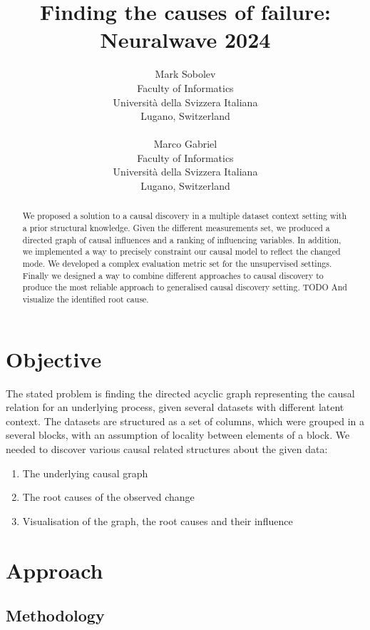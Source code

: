 \documentclass{article}
\title{Finding the causes of failure: Neuralwave 2024}
\author{
	Mark Sobolev\\
	Faculty of Informatics\\
	Università della Svizzera Italiana\\
	Lugano, Switzerland \\
	\\
	\And
	Marco Gabriel \\
	Faculty of Informatics \\
	Università della Svizzera Italiana\\
	Lugano, Switzerland \\
}
\begin{document}
	
	
	\maketitle
	

	\begin{abstract}
		We proposed a solution to a causal discovery in a multiple dataset context setting with a prior structural knowledge. Given the different measurements set, we produced a directed graph of causal influences and a ranking of influencing variables. In addition, we implemented a way to precisely constraint our causal model to reflect the changed mode. We developed a complex evaluation metric set for the unsupervised settings. Finally we designed a way to combine different approaches to causal discovery to produce the most reliable approach to generalised causal discovery setting. TODO
        And visualize the identified root cause.
	\end{abstract}
	
	
	\section{Objective} %
	
	The stated problem is finding the directed acyclic graph representing the causal relation for an underlying process, given several datasets with different latent context. The datasets are structured as a set of columns, which were grouped in a several blocks, with an assumption of locality between elements of a block. We needed to discover various causal related structures about the given data:
	
	\begin{enumerate}
		\item The underlying causal graph
		\item The root causes of the observed change
		\item Visualisation of the graph, the root causes and their influence
	\end{enumerate}


    \section{Approach} %

    \subsection{Methodology}
\end{document}

